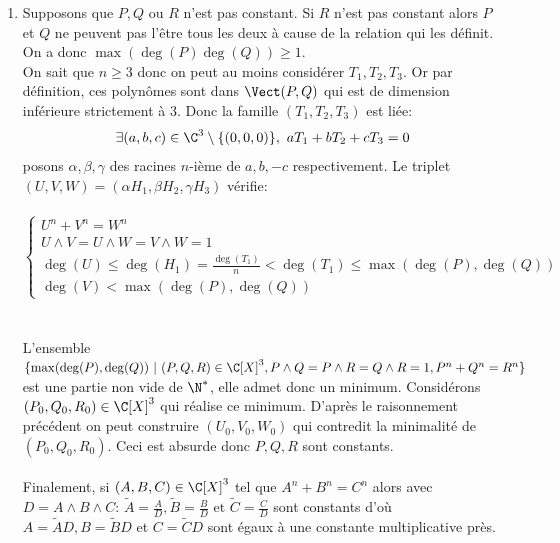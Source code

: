 \documentclass{book}
\begin{document}
\begin{enumerate}
		$$nv_R(x)=v_{R^n}(x)=v_{\prod\limits_{k=1}^n{T_k}}(x)=\displaystyle\sum\limits_{k=1}^n{v_{T_k}(x)}=v_{T_i}(x)$$
		La dernière égalité étant vraie car $v_{T_j}(x)=0$ car $T_i\wedge T_j=1$.\\
		Ainsi la multiplicité de chaque racine de $T_i$ est un multiple de $n$ : $\exists H_i\in \C[X],T_i=H_i^n$.
		\item Supposons que $P,Q$ ou $R$ n'est pas constant. Si $R$ n'est pas constant alors $P$ et $Q$ ne peuvent pas l'être tous les deux à cause de la relation qui les définit. On a donc $\max(\deg(P)\deg(Q))\geq 1$.\\
		On sait que $n\geq 3$ donc on peut au moins considérer $T_1,T_2,T_3$. Or par définition, ces polynômes sont dans $\Vect(P,Q)$ qui est de dimension inférieure strictement à $3$. Donc la famille $(T_1,T_2,T_3)$ est liée:
		$$\exists (a,b,c)\in \C^3\setminus \{(0,0,0)\},\ aT_1+bT_2+cT_3=0$$
		posons $\alpha,\beta,\gamma$ des racines $n$-ième de $a,b,-c$ respectivement. Le triplet $(U,V,W)=(\alpha H_1,\beta H_2,\gamma H_3)$ vérifie:\\\\
		$\begin{cases}
			U^n+V^n=W^n\\
			U\land V=U\land W=V\land W=1\\
			\deg(U)\leq \deg(H_1)=\displaystyle\frac{\deg(T_1)}{n}<\deg(T_1)\leq \max(\deg(P),\deg(Q))\\
			\deg(V)<\max(\deg(P),\deg(Q))
		\end{cases}$\\\\\\
		L'ensemble $\{\max(\deg(P),\deg(Q))\ |\ (P,Q,R)\in \C[X]^3,P\land Q=P\land R=Q\land R=1,P^n+Q^n=R^n\}$ est une partie non vide de $\N^*$, elle admet donc un minimum. Considérons $(P_0,Q_0,R_0)\in \C[X]^3$ qui réalise ce minimum. D'après le raisonnement précédent on peut construire $(U_0,V_0,W_0)$ qui contredit la minimalité de $(P_0,Q_0,R_0)$. Ceci est absurde donc $P,Q,R$ sont constants.\\\\
		Finalement, si $(A,B,C)\in \C[X]^3$ tel que $A^n+B^n=C^n$ alors avec $D=A\land B\land C$: $\tilde{A}=\displaystyle\frac{A}{D},\tilde{B}=\displaystyle\frac{B}{D}\text{ et }\tilde{C}=\displaystyle\frac{C}{D}$ sont constants d'où $A=\tilde{A}D,B=\tilde{B}D$ et $C=\tilde{C}D$ sont égaux à une constante multiplicative près.
	\end{enumerate}
	
	\newpage
\end{document}
